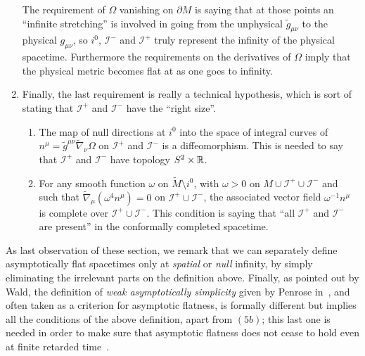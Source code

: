 \begin{definition}
\begin{enumerate}[label=(\arabic*)]
\begin{enumerate}
			\end{enumerate}
			The requirement of \(\Omega\) vanishing on \(\partial M\) is saying that at those points an ``infinite stretching'' is involved in going from the unphysical \(\tilde{g}_{\mu\nu}\) to the physical \(g_{\mu\nu}\), so \(i^0\), \(\mathscr{I}^-\) and \(\mathscr{I}^+\) truly represent the infinity of the physical spacetime. Furthermore the requirements on the derivatives of \(\Omega\) imply that the physical metric becomes flat at as one goes to infinity.
		\item Finally, the last requirement is really a technical hypothesis, which is sort of stating that \(\mathscr{I}^+\) and \(\mathscr{I}^-\) have the ``right size''.
		\begin{enumerate}
			\item The map of null directions at \(i^0\) into the space of integral curves of \(n^{\mu} = \tilde{g}^{\mu\nu} \tilde{\nabla}_{\nu}\Omega\) on  \(\mathscr{I}^+\) and \(\mathscr{I}^-\) is a diffeomorphism. This is needed to say that \(\mathscr{I}^+\) and \(\mathscr{I}^-\) have topology \(S^2\times{\mathbb{R}}\).
			\item For any smooth function \(\omega\) on \(\tilde{M} \setminus i^0\), with \(\omega > 0\) on \(M \cup \mathscr{I}^+ \cup \mathscr{I}^- \) and such that \(\tilde{\nabla}_{\mu}(\omega^4n^{\mu}) = 0\) on \(\mathscr{I}^+ \cup \mathscr{I}^-\), the associated vector field \(\omega^{-1}n^{\mu}\) is complete over \(\mathscr{I}^+ \cup \mathscr{I}^-\). This condition is saying that ``all \(\mathscr{I}^+\) and \(\mathscr{I}^-\) are present'' in the conformally completed spacetime.
			\end{enumerate}
	\end{enumerate}
\end{definition}

As last observation of these section, we remark that we can separately define asymptotically flat spacetimes only at \emph{spatial} or \emph{null} infinity, by simply eliminating the irrelevant parts on the definition above.
Finally, as pointed out by Wald, the definition of \emph{weak asymptotically simplicity} given by Penrose in~\cite{penrose1965zero}, and often taken as a criterion for asymptotic flatness, is formally different but implies all the conditions of the above definition, apart from \((5b)\); this last one is needed in order to make sure that asymptotic flatness does not cease to hold even at finite retarded time~\cite{geroch1978asymptotically}.

